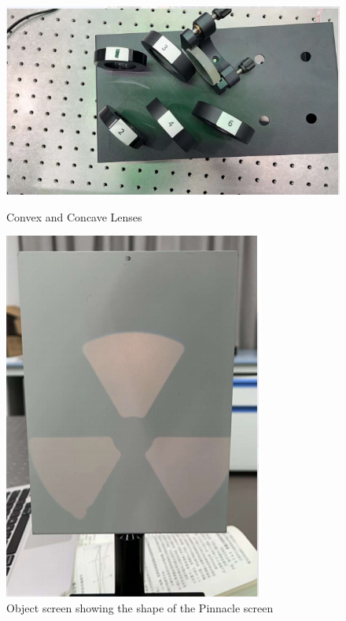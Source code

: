 \documentclass[UTF8]{article}
\begin{document}
		\begin{figure}[H]
			\begin{minipage}[t]{0.65\linewidth}
				\centering
				\includegraphics[clip,scale=0.75,trim={0 0 0 0}]{fig/fig2.png}
				\caption{Convex and Concave Lenses}
				\label{figure.2}
			\end{minipage}
			\begin{minipage}[t]{0.35\linewidth}
				\centering
				\includegraphics[clip,scale=0.55]{fig/fig3.png}
				\caption{Object screen showing the shape of the Pinnacle screen}
				\label{figure.3}
			\end{minipage}
		\end{figure}
	    
	 
\end{document}
